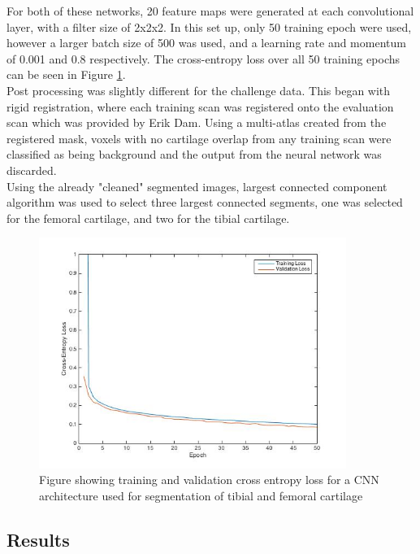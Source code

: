 \documentclass[11pt,a4paper]{memoir}
\numberwithin{figure}{section}
\numberwithin{table}{section}
\numberwithin{equation}{section}
\begin{document}
For both of these networks, 20 feature maps were generated at each convolutional layer, with a filter size of 2x2x2. In this set up, only 50 training epoch were used, however a larger batch size of 500 was used, and a learning rate and momentum of 0.001 and 0.8 respectively. The cross-entropy loss over all 50 training epochs can be seen in Figure \ref{challtrain}.\\

Post processing was slightly different for the challenge data. This began with rigid registration, where each training scan was registered onto the evaluation scan which was provided by Erik Dam. Using a multi-atlas created from the registered mask, voxels with no cartilage overlap from any training scan were classified as being background and the output from the neural network was discarded.\\

Using the already "cleaned" segmented images, largest connected component algorithm was used to select three largest connected segments, one was selected for the femoral cartilage, and two for the tibial cartilage. 

\begin{figure}
\centering
\includegraphics[width=10cm]{challloss.jpg}
\caption[Graph of cross-entropy loss for training and validation datasets for the IWOAI Segmentation Challenge]{Figure showing training and validation cross entropy loss for a CNN architecture used for segmentation of tibial and femoral cartilage }
\label{challtrain}
\end{figure}




\subsection{Results}
\end{document}
